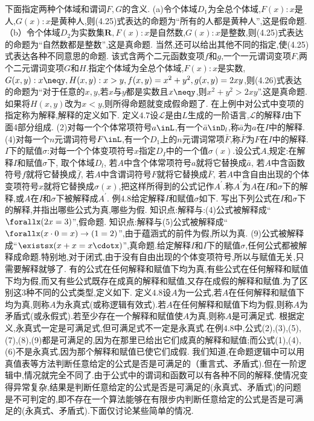 {下面指定两种个体域和谓词$F,G$的含义.
(a)令个体域$D_{1}$为全总个体域,$F(x):x$是人,$G(x):x$是黄种人,则(4.25)式表达的命题为“所有的人都是黄种人”,这是假命题.
（b）令个体域$D_{2}$为实数集$\mathbf{R},F(x):x$是自然数,$G(x):x$是整数,则(4.25)式表达的命题为“自然数都是整数”,这是真命题.
当然,还可以给出其他不同的指定,使(4.25)式表达各种不同意思的命题.
该式含两个二元函数变项$f$和$g$,一个一元谓词变项$F$,两个二元谓词变项$G$和$H$.指定个体域为全总个体域,$F(x):x$是实数,$G(x,y):x\neqy,H(x,y):x>y,f(x,y)=x^{2}+y^{2},g(x,y)=2xy$,则(4.26)式表达的命题为“对于任意的$x,y$,若$x$与$y$都是实数且$x\neqy$,则$x^{2}+y^{2}>2xy$”.这是真命题.如果将$H(x,y)$改为$x<y$,则所得命题就变成假命题了.
在上例中对公式中变项的指定称为解释,解释的定义如下.
定义$4.7$设$\mathscr{L}$是由$L$生成的一阶语言,$\mathscr{L}$的解释$I$由下面4部分组成.
(2)对每一个个体常项符号$a\inL$,有一个$\bar{a}\inD_{l}$,称$\bar{a}$为$a$在$I$中的解释.
(4)对每一个$n$元谓词符号$F\inL$,有一个$D_{1}$上的$n$元谓词常项$\bar{F}$,称$\bar{F}$为$F$在$I$中的解释.
$I$下的赋值$\sigma$:对每一个个体变项符号$x$指定$D_{I}$中的一个值$\sigma(x)$.设公式$A$,规定:在解释$I$和赋值$\sigma$下,
取个体域$D_{l}$,
若$A$中含个体常项符号$a$就将它替换成$\bar{a}$,
若$A$中含函数符号$f$就将它替换成$\bar{f}$,
若$A$中含谓词符号$F$就将它替换成$\bar{F}$,
若$A$中含自由出现的个体变项符号$x$就将它替换成$\sigma(x)$,把这样所得到的公式记作$A^{\prime}$.称$A^{\prime}$为$A$在$I$和$\sigma$下的解释,或$A$在$I$和$\sigma$下被解释成$A^{\prime}$.
例$4.8$给定解释$I$和赋值$\sigma$如下.
写出下列公式在$I$和$\sigma$下的解释,并指出哪些公式为真,哪些为假.
知识点:解释与:(4)公式被解释成“$\forallx(2x=3)$”,假命题.
知识点:解释与(5)公式被解释成“$\forallx(x\cdot0=x)\rightarrow(1=2)$”,由于蕴涵式的前件为假,所以为真.
(9)公式被解释成“$\existsx(x+x=x\cdotx)$”,真命题.给定解释$I$和$I$下的赋值$\sigma$,任何公式都被解释成命题.特别地,对于闭式,由于没有自由出现的个体变项符号,所以与赋值无关,只需要解释就够了.
有的公式在任何解释和赋值下均为真,有些公式在任何解释和赋值下均为假,而又有些公式既存在成真的解释和赋值,又存在成假的解释和赋值.为了区别这3种不同的公式类型,定义如下.
定义$4.8$设$A$为一公式,若$A$在任何解释和赋值下均为真,则称$A$为永真式(或称逻辑有效式).若$A$在任何解释和赋值下均为假,则称$A$为矛盾式(或永假式).若至少存在一个解释和赋值使$A$为真,则称$A$是可满足式.
根据定义,永真式一定是可满足式,但可满足式不一定是永真式.在例$4.8$中,公式(2),(3),(5),(7),(8),(9)都是可满足的,因为在那里已给出它们成真的解释和赋值;而公式(1),(4),(6)不是永真式,因为那个解释和赋值已使它们成假.
我们知道,在命题逻辑中可以用真值表等方法判断任意给定的公式是否是可满足的（重言式、矛盾式).但在一阶逻辑中,情况就完全不同了.由于公式中的谓词和函数可以有各种不同的解释,使情况变得异常复杂,结果是判断任意给定的公式是否是可满足的(永真式、矛盾式)的问题是不可判定的,即不存在一个算法能够在有限步内判断任意给定的公式是否是可满足的(永真式、矛盾式).下面仅讨论某些简单的情况.
}
